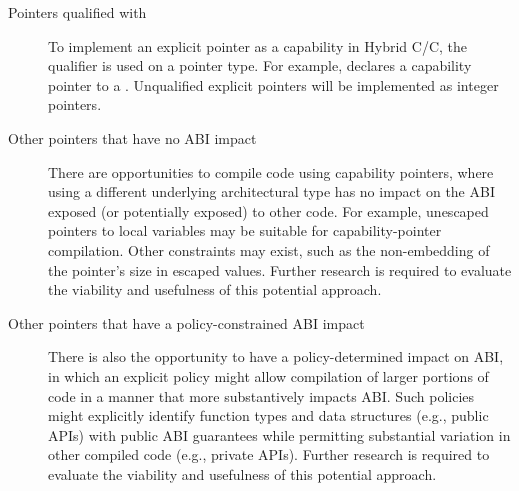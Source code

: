 \documentclass[12pt,twoside,openright,a4paper]{article}
\newcommand{\ccode}[1]{{\small\ttfamily{#1}}}
\newcommand{\uucap}{{\ccode{\_\_capability}}\xspace}
\newcommand{\futurevariant}[1]{{\color{purple} #1}}
\newcommand{\note}[2]{{\color{blue}[ Note: #1 - #2]}}
\renewcommand{\note}[2]{\relax\ifhmode\unskip\fi}
\newcommand{\psnote}[1]{\note{#1}{Peter S.}}
\newcommand{\dcnote}[1]{\note{#1}{David}}
\newcommand*{\cpp}{\texorpdfstring{C\textsmaller[2]{\protect\nolinebreak[4]\hspace{-.05em}\raisebox{.45ex}{\textbf{++}}}}{C++}}
\newcommand*{\COrCpp}{C/\cpp{}}
\newcommand*{\hybridCOrCpp}{Hybrid \COrCpp{}}
\begin{document}
\begin{description}
\item[Pointers qualified with \uucap{}]
  To implement an explicit pointer as a capability in \hybridCOrCpp{}, the
  qualifier \uucap{} is used on a pointer type.
  For example, \ccode{char * \_\_capability c} declares a capability pointer
  to a \ccode{char}.
  Unqualified explicit pointers will be implemented as integer pointers.


\psnote{The following two items seem to be a radical shift of focus, from what hybrid currently is to (free-wheeling or prototyped?  unclear) speculation about what one could do instead/aswell.  Suggest either skipping or very clearly labelling with their actual status}
  
\item[Other pointers that have no ABI impact]
  \futurevariant{There are opportunities to compile code using capability
  pointers, where using a different underlying architectural type has no
  impact on the ABI exposed (or potentially exposed) to other code.
  For example, unescaped pointers to local variables may be suitable for
  capability-pointer compilation.
  Other constraints may exist, such as the non-embedding of the pointer's size
  in escaped values.
  Further research is required to evaluate the viability and usefulness of
  this potential approach.}
  \dcnote{There's also research needed on the value of this.  The set of things
  described above looks similar to the set that can be statically
        verified as safe and so does not benefit from capabilities.  This
        becomes a lot more interesting in the context of whole-program (or
        whole-library) analysis, where the complexity of verifying the safety
        properties grows much faster than escape analysis.}

\item[Other pointers that have a policy-constrained ABI impact]
  \futurevariant{There is also the opportunity to have a policy-determined
  impact on ABI, in which an explicit policy might allow compilation of
  larger portions of code in a manner that more substantively impacts ABI.
  Such policies might explicitly identify function types and data structures
  (e.g., public APIs) with public ABI guarantees while permitting substantial
  variation in other compiled code (e.g., private APIs).
  Further research is required to evaluate the viability and usefulness of
  this potential approach.}
\end{description}
\end{document}
